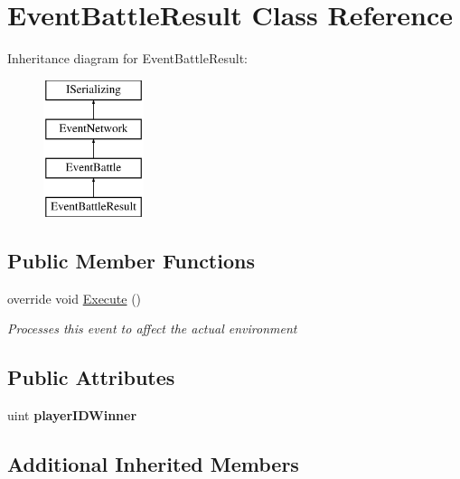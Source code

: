 \hypertarget{class_event_battle_result}{\section{Event\-Battle\-Result Class Reference}
\label{class_event_battle_result}
}
Inheritance diagram for Event\-Battle\-Result\-:\begin{figure}[H]
\begin{center}
\leavevmode
\includegraphics[height=4.000000cm]{class_event_battle_result}
\end{center}
\end{figure}
\subsection*{Public Member Functions}
\begin{DoxyCompactItemize}
\item 
override void \hyperlink{class_event_battle_result_ae2c6d5e3e01daef4de97df2e481fcac5}{Execute} ()
\begin{DoxyCompactList}\small\item\em Processes this event to affect the actual environment \end{DoxyCompactList}\end{DoxyCompactItemize}
\subsection*{Public Attributes}
\begin{DoxyCompactItemize}
\item 
\hypertarget{class_event_battle_result_a4a074620783349f4b80d301c369a0cec}{uint {\bfseries player\-I\-D\-Winner}}\label{class_event_battle_result_a4a074620783349f4b80d301c369a0cec}

\end{DoxyCompactItemize}
\subsection*{Additional Inherited Members}


